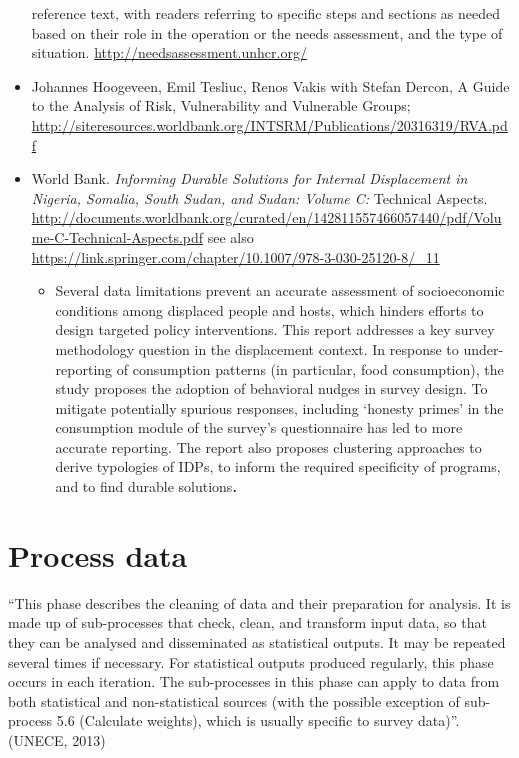 \documentclass[
]{article}
\providecommand{\tightlist}{%
  \setlength{\itemsep}{0pt}\setlength{\parskip}{0pt}}
\begin{document}
\begin{itemize}
  reference text, with readers referring to specific steps and
  sections as needed based on their role in the operation or the needs
  assessment, and the type of situation.
  \url{http://needsassessment.unhcr.org/}
\item
  Johannes Hoogeveen, Emil Tesliuc, Renos Vakis with Stefan Dercon, A
  Guide to the Analysis of Risk, Vulnerability and Vulnerable Groups;
  \url{http://siteresources.worldbank.org/INTSRM/Publications/20316319/RVA.pdf}
\item
  World Bank. \emph{Informing Durable Solutions for Internal Displacement
  in Nigeria, Somalia, South Sudan, and Sudan: Volume C:} Technical
  Aspects.
  \url{http://documents.worldbank.org/curated/en/142811557466057440/pdf/Volume-C-Technical-Aspects.pdf}
  see also
  \url{https://link.springer.com/chapter/10.1007/978-3-030-25120-8/_11}

  \begin{itemize}
  \tightlist
  \item
    Several data limitations prevent an accurate assessment of
    socioeconomic conditions among displaced people and hosts, which
    hinders efforts to design targeted policy interventions. This
    report addresses a key survey methodology question in the
    displacement context. In response to under- reporting of
    consumption patterns (in particular, food consumption), the
    study proposes the adoption of behavioral nudges in survey
    design. To mitigate potentially spurious responses, including
    `honesty primes' in the consumption module of the survey's
    questionnaire has led to more accurate reporting. The report
    also proposes clustering approaches to derive typologies of
    IDPs, to inform the required specificity of programs, and to
    find durable solutions\textbf{. }
  \end{itemize}
\end{itemize}

\hypertarget{process-data-1}{%
\section{Process data}\label{process-data-1}}

``This phase describes the cleaning of data and their preparation for
analysis. It is made up of sub-processes that check, clean, and
transform input data, so that they can be analysed and disseminated as
statistical outputs. It may be repeated several times if necessary. For
statistical outputs produced regularly, this phase occurs in each
iteration. The sub-processes in this phase can apply to data from both
statistical and non-statistical sources (with the possible exception of
sub-process 5.6 (Calculate weights), which is usually specific to survey
data)''. (UNECE, 2013)
\end{document}
